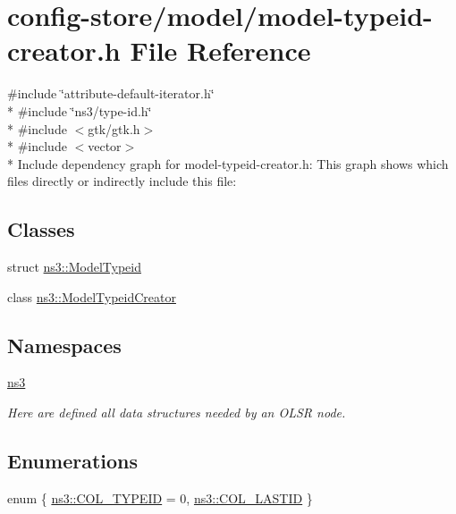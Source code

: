 \hypertarget{model-typeid-creator_8h}{}\section{config-\/store/model/model-\/typeid-\/creator.h File Reference}
\label{model-typeid-creator_8h}
{\ttfamily \#include \char`\"{}attribute-\/default-\/iterator.\+h\char`\"{}}\\*
{\ttfamily \#include \char`\"{}ns3/type-\/id.\+h\char`\"{}}\\*
{\ttfamily \#include $<$gtk/gtk.\+h$>$}\\*
{\ttfamily \#include $<$vector$>$}\\*
Include dependency graph for model-\/typeid-\/creator.h\+:
This graph shows which files directly or indirectly include this file\+:
\subsection*{Classes}
\begin{DoxyCompactItemize}
\item 
struct \hyperlink{structns3_1_1ModelTypeid}{ns3\+::\+Model\+Typeid}
\item 
class \hyperlink{classns3_1_1ModelTypeidCreator}{ns3\+::\+Model\+Typeid\+Creator}
\end{DoxyCompactItemize}
\subsection*{Namespaces}
\begin{DoxyCompactItemize}
\item 
 \hyperlink{namespacens3}{ns3}
\begin{DoxyCompactList}\small\item\em Here are defined all data structures needed by an O\+L\+SR node. \end{DoxyCompactList}\end{DoxyCompactItemize}
\subsection*{Enumerations}
\begin{DoxyCompactItemize}
\item 
enum \{ \hyperlink{namespacens3_a49d343aca0eab4df1a26e1f1f0de5425ac2aa86d94a34a573cb0a430b4bbf9a9f}{ns3\+::\+C\+O\+L\+\_\+\+T\+Y\+P\+E\+ID} = 0, 
\hyperlink{namespacens3_a49d343aca0eab4df1a26e1f1f0de5425aecb2eb5c4589fe750b3be7acff68d8b2}{ns3\+::\+C\+O\+L\+\_\+\+L\+A\+S\+T\+ID}
 \}
\end{DoxyCompactItemize}
